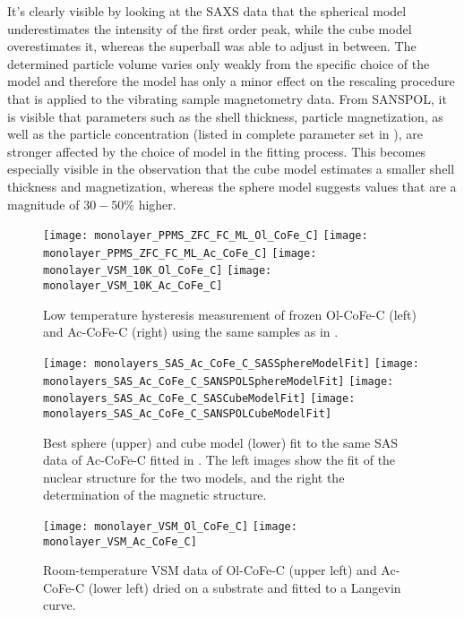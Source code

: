 \documentclass[\main/dresen_thesis.tex]{subfiles}
\begin{document}
    It's clearly visible by looking at the SAXS data that the spherical model underestimates the intensity of the first order peak, while the cube model overestimates it, whereas the superball was able to adjust in between.
    The determined particle volume varies only weakly from the specific choice of the model and therefore the model has only a minor effect on the rescaling procedure that is applied to the vibrating sample magnetometry data.
    From SANSPOL, it is visible that parameters such as the shell thickness, particle magnetization, as well as the particle concentration (listed in complete parameter set in ), are stronger affected by the choice of model in the fitting process.
    This becomes especially visible in the observation that the cube model estimates a smaller shell thickness and magnetization, whereas the sphere model suggests values that are a magnitude of $30 - 50 \unit{\%}$ higher.

    \begin{figure}[tb]
      \centering
      \texttt{[image: monolayer\_PPMS\_ZFC\_FC\_ML\_Ol\_CoFe\_C]}
      \texttt{[image: monolayer\_PPMS\_ZFC\_FC\_ML\_Ac\_CoFe\_C]}
      \texttt{[image: monolayer\_VSM\_10K\_Ol\_CoFe\_C]}
      \texttt{[image: monolayer\_VSM\_10K\_Ac\_CoFe\_C]}
      \caption{\label{fig:monolaye rs:nanoparticle:vsm10K}Low temperature hysteresis measurement of frozen Ol-CoFe-C (left) and Ac-CoFe-C (right) using the same samples as in .}
    \end{figure}

    \begin{figure}[tb]
      \centering
      \texttt{[image: monolayers\_SAS\_Ac\_CoFe\_C\_SASSphereModelFit]}
      \texttt{[image: monolayers\_SAS\_Ac\_CoFe\_C\_SANSPOLSphereModelFit]}
      \texttt{[image: monolayers\_SAS\_Ac\_CoFe\_C\_SASCubeModelFit]}
      \texttt{[image: monolayers\_SAS\_Ac\_CoFe\_C\_SANSPOLCubeModelFit]}
      \caption{\label{fig:monolayers:nanoparticle:sas:SphereCubeFit}Best sphere (upper) and cube model (lower) fit to the same SAS data of Ac-CoFe-C fitted in . The left images show the fit of the nuclear structure for the two models, and the right the determination of the magnetic structure.}
    \end{figure}


    \begin{figure}[tb]
      \centering
      \texttt{[image: monolayer\_VSM\_Ol\_CoFe\_C]}
      \texttt{[image: monolayer\_VSM\_Ac\_CoFe\_C]}
      \caption{\label{fig:monolayers:nanoparticle:vsm}Room-temperature VSM data of Ol-CoFe-C (upper left) and Ac-CoFe-C (lower left) dried on a substrate and fitted to a Langevin curve.}
    \end{figure}
\end{document}
